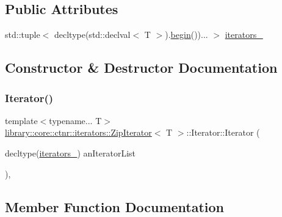 \subsection*{Public Attributes}
\begin{DoxyCompactItemize}
\item 
std\+::tuple$<$ decltype(std\+::declval$<$ T $>$).\mbox{\hyperlink{classlibrary_1_1core_1_1ctnr_1_1iterators_1_1_zip_iterator_a0467e25b565ac7b73b22a7002b87d189}{begin}}())... $>$ \mbox{\hyperlink{classlibrary_1_1core_1_1ctnr_1_1iterators_1_1_zip_iterator_1_1_iterator_a37c838a652996c4a8d140f1cc3804e4a}{iterators\+\_\+}}
\end{DoxyCompactItemize}


\subsection{Constructor \& Destructor Documentation}
\mbox{\label{classlibrary_1_1core_1_1ctnr_1_1iterators_1_1_zip_iterator_1_1_iterator_ab93e780bb41bdb0fbce8e852138051a4}} 
\subsubsection{\texorpdfstring{Iterator()}{Iterator()}}
{\footnotesize\ttfamily template$<$typename... T$>$ \\
\mbox{\hyperlink{classlibrary_1_1core_1_1ctnr_1_1iterators_1_1_zip_iterator}{library\+::core\+::ctnr\+::iterators\+::\+Zip\+Iterator}}$<$ T $>$\+::Iterator\+::\+Iterator (\begin{DoxyParamCaption}\item[{decltype(\mbox{\hyperlink{classlibrary_1_1core_1_1ctnr_1_1iterators_1_1_zip_iterator_1_1_iterator_a37c838a652996c4a8d140f1cc3804e4a}{iterators\+\_\+}})}]{an\+Iterator\+List }\end{DoxyParamCaption})\hspace{0.3cm}{\ttfamily [inline]}, {\ttfamily [explicit]}}



\subsection{Member Function Documentation}
\mbox{\label{classlibrary_1_1core_1_1ctnr_1_1iterators_1_1_zip_iterator_1_1_iterator_ae3e898d5e9a5f0aa7f1f076de6af8063}} 
